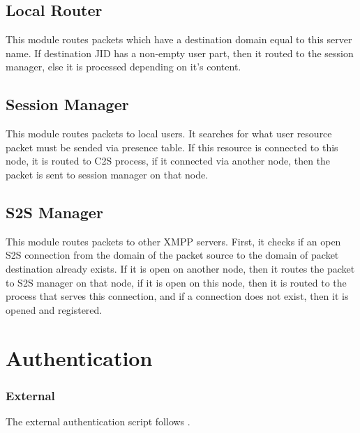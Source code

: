 \documentclass[a4paper,10pt]{article}
\newcommand{\ind}[1]{\begin{latexonly}\index{#1}\end{latexonly}}
\newcommand{\XMPP}{XMPP}
\begin{document}
\subsection{Local Router}

This module routes packets which have a destination domain equal to this server
name.  If destination JID has a non-empty user part, then it routed to the
session manager, else it is processed depending on it's content.


\subsection{Session Manager}

This module routes packets to local users.  It searches for what user resource
packet must be sended via presence table.  If this resource is connected to
this node, it is routed to C2S process, if it connected via another node, then
the packet is sent to session manager on that node.


\subsection{S2S Manager}

This module routes packets to other \XMPP{} servers.  First, it checks if an
open S2S connection from the domain of the packet source to the domain of
packet destination already exists. If it is open on another node, then it
routes the packet to S2S manager on that node, if it is open on this node, then
it is routed to the process that serves this connection, and if a connection
does not exist, then it is opened and registered.


\section{Authentication}

\subsubsection{External}
\label{externalauth}
\ind{external authentication}

The external authentication script follows
.
\end{document}
